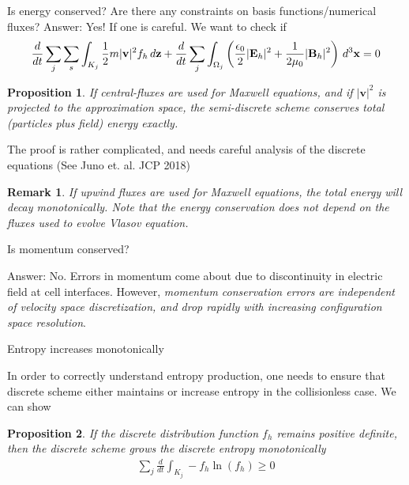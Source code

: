 \documentclass[pdf]{beamer}
\newcommand{\mvec}[1]{\mathbf{#1}}
\newcommand{\dtx}{\thinspace d^3\mvec{x}}
\newtheorem{remark}{Remark}
\newtheorem{proposition}{Proposition}
\theoremstyle{definition}
\begin{document}
\begin{frame}{Is energy conserved? Are there any constraints on basis
    functions/numerical fluxes?}
  \small
  Answer: Yes! If one is careful. We want to check if
  \begin{align*}
    \frac{d}{dt}
    \sum_{j} \sum_s \int_{K_j}\frac{1}{2} m|\mvec{v}|^2 f_h
    \thinspace d\mvec{z}
    +
    \frac{d}{dt}
    \sum_j
    \int_{\Omega_j}
      \left(
        \frac{\epsilon_0}{2}|\mvec{E}_h|^2 + \frac{1}{2\mu_0}|\mvec{B}_h|^2
      \right)      
      \dtx
    =
    0
  \end{align*}
  \begin{proposition}
    If central-fluxes are used for Maxwell equations, and if
    $|\mvec{v}|^2$ is projected to the approximation space, the
    semi-discrete scheme conserves total (particles plus field) energy
    exactly.
  \end{proposition}
  The proof is rather complicated, and needs careful analysis of the
  discrete equations (See Juno et. al. JCP 2018)
  \begin{remark}
    If upwind fluxes are used for Maxwell equations, the total energy
    will decay monotonically. Note that the energy conservation does
    not depend on the fluxes used to evolve Vlasov equation.
  \end{remark}
  
\end{frame}

\begin{frame}{Is momentum conserved?}

  Answer: {\color{red} No}. Errors in momentum come about due to
  discontinuity in electric field at cell interfaces. However,
  \emph{momentum conservation errors are independent of velocity space
    discretization, and drop rapidly with increasing configuration
    space resolution}.

\end{frame}

\begin{frame}{Entropy increases monotonically}

  In order to correctly understand entropy production, one needs to
  ensure that discrete scheme either maintains or increase entropy in
  the collisionless case. We can show
  \begin{proposition}
    If the discrete distribution function $f_h$ remains positive
    definite, then the discrete scheme grows the discrete entropy
    monotonically
    \begin{align*}
      \sum_j \frac{d}{dt} \int_{K_j} -f_h \ln(f_h) \geq 0
    \end{align*}
  \end{proposition}
\end{frame}
\end{document}
